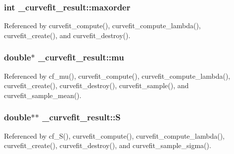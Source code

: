 \subsubsection[{\texorpdfstring{maxorder}{maxorder}}]{\setlength{\rightskip}{0pt plus 5cm}int \+\_\+curvefit\+\_\+result\+::maxorder}\hypertarget{struct__curvefit__result_ad13ba13973e6cbcaa18a130fffffc51e}{}\label{struct__curvefit__result_ad13ba13973e6cbcaa18a130fffffc51e}


Referenced by curvefit\+\_\+compute(), curvefit\+\_\+compute\+\_\+lambda(), curvefit\+\_\+create(), and curvefit\+\_\+destroy().

\subsubsection[{\texorpdfstring{mu}{mu}}]{\setlength{\rightskip}{0pt plus 5cm}double$\ast$ \+\_\+curvefit\+\_\+result\+::mu}\hypertarget{struct__curvefit__result_a383aaa533afdf17d91c26133f629e3e8}{}\label{struct__curvefit__result_a383aaa533afdf17d91c26133f629e3e8}


Referenced by cf\+\_\+mu(), curvefit\+\_\+compute(), curvefit\+\_\+compute\+\_\+lambda(), curvefit\+\_\+create(), curvefit\+\_\+destroy(), curvefit\+\_\+sample(), and curvefit\+\_\+sample\+\_\+mean().

\subsubsection[{\texorpdfstring{S}{S}}]{\setlength{\rightskip}{0pt plus 5cm}double$\ast$$\ast$ \+\_\+curvefit\+\_\+result\+::S}\hypertarget{struct__curvefit__result_a77d02b3f78f1ad80cccad96f565c62f3}{}\label{struct__curvefit__result_a77d02b3f78f1ad80cccad96f565c62f3}


Referenced by cf\+\_\+\+S(), curvefit\+\_\+compute(), curvefit\+\_\+compute\+\_\+lambda(), curvefit\+\_\+create(), curvefit\+\_\+destroy(), and curvefit\+\_\+sample\+\_\+sigma().

